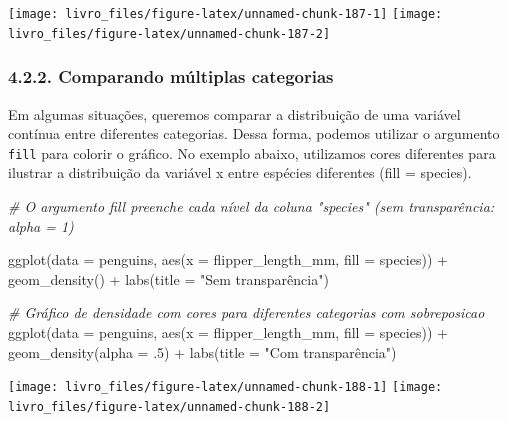 \documentclass[
]{book}
\newenvironment{Shaded}{\begin{snugshade}}{\end{snugshade}}
\newcommand{\AttributeTok}[1]{\textcolor[rgb]{0.61,0.61,0.61}{#1}}
\newcommand{\CommentTok}[1]{\textcolor[rgb]{0.37,0.37,0.37}{\textit{#1}}}
\newcommand{\DecValTok}[1]{\textcolor[rgb]{0.06,0.06,0.06}{#1}}
\newcommand{\FunctionTok}[1]{\textcolor[rgb]{0,0,0}{#1}}
\newcommand{\NormalTok}[1]{#1}
\newcommand{\SpecialCharTok}[1]{\textcolor[rgb]{0,0,0}{#1}}
\newcommand{\StringTok}[1]{\textcolor[rgb]{0.5,0.5,0.5}{#1}}
\begin{document}
\begin{center}\texttt{[image: livro\_files/figure-latex/unnamed-chunk-187-1]} \texttt{[image: livro\_files/figure-latex/unnamed-chunk-187-2]} \end{center}

\hypertarget{comparando-muxfaltiplas-categorias-1}{%
\subsubsection{4.2.2. Comparando múltiplas categorias}\label{comparando-muxfaltiplas-categorias-1}}

Em algumas situações, queremos comparar a distribuição de uma variável contínua entre diferentes categorias. Dessa forma, podemos utilizar o argumento \texttt{fill} para colorir o gráfico. No exemplo abaixo, utilizamos cores diferentes para ilustrar a distribuição da variável x entre espécies diferentes (fill = species).

\begin{Shaded}
\begin{Highlighting}[]

\CommentTok{\# O argumento fill preenche cada nível da coluna "species" (sem transparência: alpha = 1)}

\FunctionTok{ggplot}\NormalTok{(}\AttributeTok{data =}\NormalTok{ penguins, }
       \FunctionTok{aes}\NormalTok{(}\AttributeTok{x =}\NormalTok{ flipper\_length\_mm, }\AttributeTok{fill =}\NormalTok{ species)) }\SpecialCharTok{+}
  \FunctionTok{geom\_density}\NormalTok{() }\SpecialCharTok{+}
  \FunctionTok{labs}\NormalTok{(}\AttributeTok{title =} \StringTok{"Sem transparência"}\NormalTok{)}

\CommentTok{\# Gráfico de densidade com cores para diferentes categorias com sobreposicao}
\FunctionTok{ggplot}\NormalTok{(}\AttributeTok{data =}\NormalTok{ penguins, }
       \FunctionTok{aes}\NormalTok{(}\AttributeTok{x =}\NormalTok{ flipper\_length\_mm, }\AttributeTok{fill =}\NormalTok{ species)) }\SpecialCharTok{+}
  \FunctionTok{geom\_density}\NormalTok{(}\AttributeTok{alpha =}\NormalTok{ .}\DecValTok{5}\NormalTok{) }\SpecialCharTok{+}
  \FunctionTok{labs}\NormalTok{(}\AttributeTok{title =} \StringTok{"Com transparência"}\NormalTok{)}
\end{Highlighting}
\end{Shaded}

\begin{center}\texttt{[image: livro\_files/figure-latex/unnamed-chunk-188-1]} \texttt{[image: livro\_files/figure-latex/unnamed-chunk-188-2]} \end{center}
\end{document}
